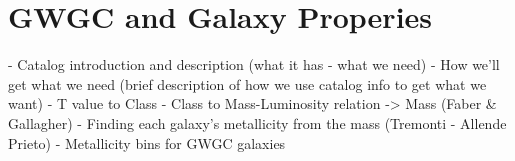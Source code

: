 \chapter{GWGC and Galaxy Properies}
- Catalog introduction and description (what it has - what we need)
- How we'll get what we need (brief description of how we use catalog info to get what we want)
    - T value to Class
        - Class to Mass-Luminosity relation -> Mass (Faber \& Gallagher)
    - Finding each galaxy's metallicity from the mass (Tremonti - Allende Prieto)
- Metallicity bins for GWGC galaxies
